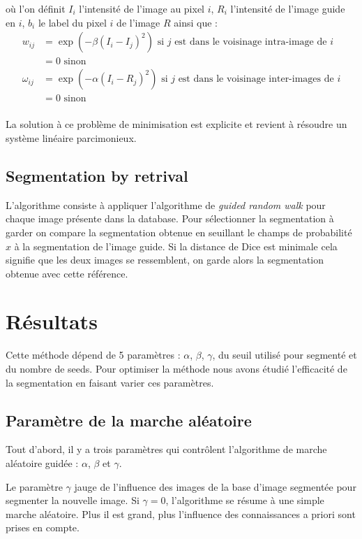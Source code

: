 \documentclass{article}
\begin{document}
où l'on définit $I_i$ l'intensité de l'image au pixel $i$, $R_i$ l'intensité de l'image guide en $i$, $b_i$ le label du pixel $i$ de l'image $R$ ainsi que :
\begin{align*}
w_{ij} &= \exp(-\beta(I_i-I_j)^2) \text{ si $j$ est dans le voisinage intra-image de $i$} \\
      &= 0 \text{ sinon}\\
\omega_{ij} &= \exp(-\alpha(I_i-R_j)^2) \text{ si $j$ est dans le voisinage inter-images de $i$}\\
           &= 0 \text{ sinon}\\
\end{align*}

La solution à ce problème de minimisation est explicite et revient à résoudre un système linéaire parcimonieux.

\subsection{Segmentation by retrival}

L'algorithme consiste à appliquer l'algorithme de \textit{guided random walk} pour chaque image présente dans la database. Pour sélectionner la segmentation à garder on compare la segmentation obtenue en seuillant le champs de probabilité $x$ à la segmentation de l'image guide. Si la distance de Dice est minimale cela signifie que les deux images se ressemblent, on garde alors la segmentation obtenue avec cette référence.


\section{Résultats}

Cette méthode dépend de 5 paramètres : $\alpha$, $\beta$, $\gamma$, du seuil utilisé pour segmenté et du nombre de seeds. Pour optimiser la méthode nous avons étudié l’efficacité de la segmentation en faisant varier ces paramètres.

\subsection{Paramètre de la marche aléatoire}

Tout d’abord, il y a trois paramètres qui contrôlent l’algorithme de marche aléatoire guidée : $\alpha$, $\beta$ et $\gamma$. 

Le paramètre $\gamma$ jauge de l’influence des images de la base d’image segmentée pour segmenter la nouvelle image. Si $\gamma=0$, l’algorithme se résume à une simple marche aléatoire. Plus il est grand, plus l’influence des connaissances a priori sont prises en compte. 
\end{document}
